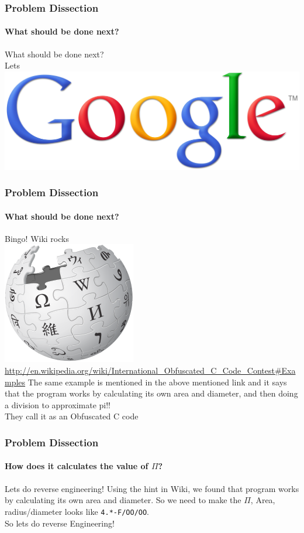 \documentclass[12pt]{beamer}
\begin{document}
\begin{frame}
	\frametitle{Problem Dissection}
	\framesubtitle{What should be done next?}
	\begin{center}
		\small {What should be done next?} \\
		\small {Lets} \\
		\includegraphics[scale=0.05]{images/google-logo.jpg} 
	\end{center}
\end{frame}

\begin{frame}
	\frametitle{Problem Dissection}
	\framesubtitle{What should be done next?}
	\begin{center}
		\small {Bingo! Wiki rocks} \\
		\includegraphics[scale=0.3]{images/220px-Wikipedia-logo-v2.png}\\
		{\tiny \url{http://en.wikipedia.org/wiki/International_Obfuscated_C_Code_Contest\#Examples}}
		{\tiny The same example is mentioned in the above mentioned link and it says that the program works by calculating its own area and diameter, and then doing a division to approximate pi!!} \\
		{\small They call it as an Obfuscated C code}
	\end{center}
\end{frame}

\begin{frame}
	\frametitle{Problem Dissection}
	\framesubtitle{How does it calculates the value of $\Pi$?}
	\begin{block}{Lets do reverse engineering!}
		Using the hint in Wiki, we found that program works by calculating its own area and diameter. So we need to make the $\Pi$, Area, radius/diameter looks like \texttt{4.*-F/OO/OO}. \\ So lets do reverse Engineering!
	\end{block}
\end{frame}
\end{document}
